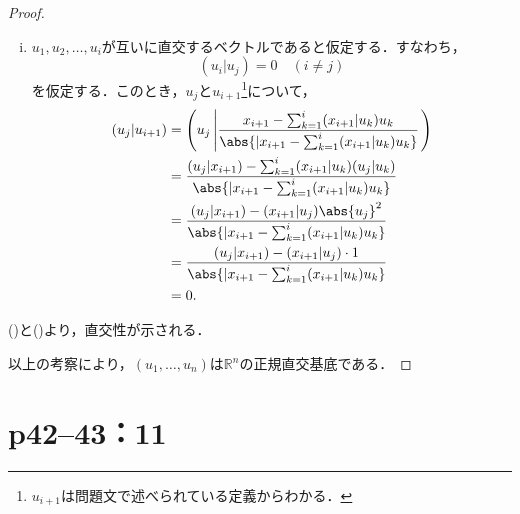 \begin{tleftbar}
\begin{proof}
\begin{description}
\begin{enumerate}[(i)]
                      \item $u_1, u_2, \ldots, u_i$が互いに直交するベクトルであると仮定する．すなわち，
                            \[
                                (u_i | u_j) = 0 \quad (i \ne j)
                            \]
                            を仮定する．このとき，$u_j$と$u_{i+1}$\footnote{$u_{i+1}$は問題文で述べられている定義からわかる．}について，
                            \begin{align*}
                                (u_j | u_{i+1}) & =\left  ( u_j \left| \frac{x_{i+1} - \sum_{k=1}^{i} (x_{i+1} | u_k) u_k}{\abs{| x_{i+1} - \sum_{k=1}^{i} (x_{i+1} | u_k) u_k }} \right. \right) \\
                                                & = \frac{(u_j | x_{i+1}) - \sum_{k=1}^{i} (x_{i+1} | u_k) (u_j | u_k)}{\abs{| x_{i+1} - \sum_{k=1}^{i} (x_{i+1} | u_k) u_k }}                    \\
                                                & = \frac{(u_j | x_{i+1}) - (x_{i+1} | u_j) \abs{u_j}^2}{\abs{| x_{i+1} - \sum_{k=1}^{i} (x_{i+1} | u_k) u_k }}                                   \\
                                                & = \frac{(u_j | x_{i+1}) - (x_{i+1} | u_j) \cdot 1}{\abs{| x_{i+1} - \sum_{k=1}^{i} (x_{i+1} | u_k) u_k }}                                       \\
                                                & = 0.
                            \end{align*}
                  \end{enumerate}
                  ()と()より，直交性が示される．
        \end{description}
        以上の考察により，$(u_1, \ldots, u_n)$は$\mathbb{R}^n$の正規直交基底である．
    \end{proof}
\end{tleftbar}

\newpage

\section*{p42--43：11}

